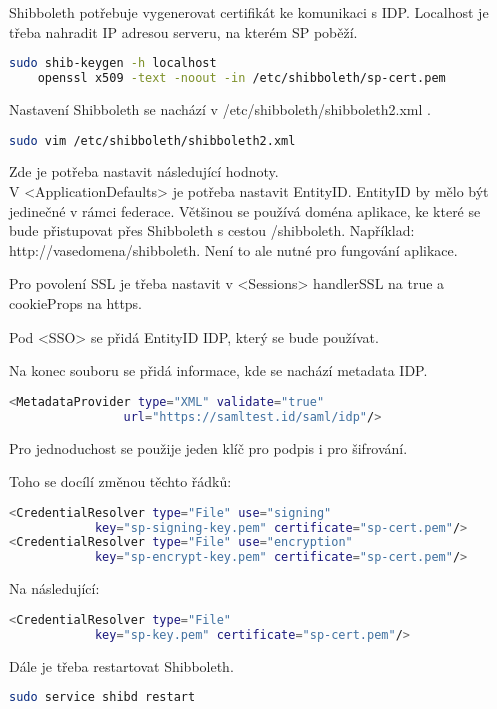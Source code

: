 Shibboleth potřebuje vygenerovat certifikát ke komunikaci s IDP. Localhost je třeba nahradit IP adresou serveru, na kterém SP poběží.
\begin{lstlisting}[language=Bash]
    sudo shib-keygen -h localhost
    openssl x509 -text -noout -in /etc/shibboleth/sp-cert.pem
\end{lstlisting}

Nastavení Shibboleth se nachází v /etc/shibboleth/shibboleth2.xml .

\begin{lstlisting}[language=Bash]
   sudo vim /etc/shibboleth/shibboleth2.xml
\end{lstlisting}

Zde je potřeba nastavit následující hodnoty. \\V <ApplicationDefaults> je potřeba nastavit EntityID. EntityID by mělo být jedinečné v rámci federace. Většinou se používá doména aplikace, ke které se bude přistupovat přes Shibboleth s cestou /shibboleth. Například: http://vasedomena/shibboleth. Není to ale nutné pro fungování aplikace.

Pro povolení SSL je třeba nastavit v <Sessions>  handlerSSL na true a cookieProps na https.

Pod <SSO> se přidá EntityID IDP, který se bude používat.

Na konec souboru se přidá informace, kde se nachází metadata IDP.
\begin{lstlisting}[language=Bash]
 <MetadataProvider type="XML" validate="true"
                url="https://samltest.id/saml/idp"/>
\end{lstlisting}

Pro jednoduchost se použije jeden klíč pro podpis i pro šifrování.

Toho se docílí změnou těchto řádků:
\begin{lstlisting}[language=Bash]
<CredentialResolver type="File" use="signing"
            key="sp-signing-key.pem" certificate="sp-cert.pem"/>
<CredentialResolver type="File" use="encryption"
            key="sp-encrypt-key.pem" certificate="sp-cert.pem"/>
\end{lstlisting}

Na následující:
\begin{lstlisting}[language=Bash]
<CredentialResolver type="File"
            key="sp-key.pem" certificate="sp-cert.pem"/>
\end{lstlisting}

Dále je třeba restartovat Shibboleth.
\begin{lstlisting}[language=Bash]
sudo service shibd restart
\end{lstlisting}

